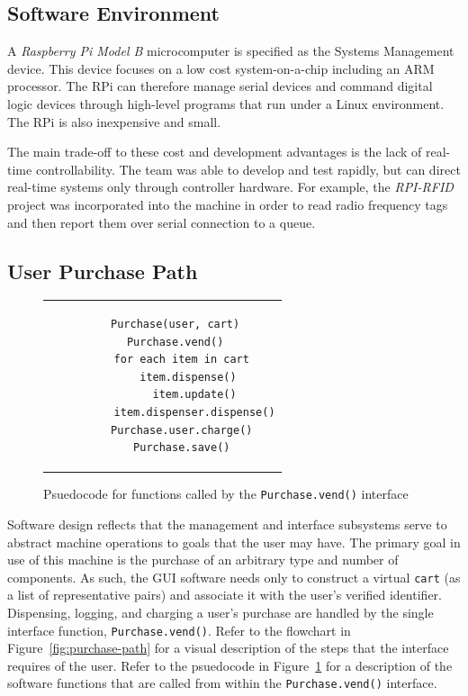 \documentclass[12pt,oneside,final]{article}
\begin{document}
\subsection{Software Environment}
A \emph{Raspberry Pi Model B} microcomputer is specified as the Systems Management device. This device focuses on a low cost system-on-a-chip including an ARM processor. The RPi can therefore manage serial devices and command digital logic devices through high-level programs that run under a Linux environment. The RPi is also inexpensive and small.

The main trade-off to these cost and development advantages is the lack of real-time controllability. The team was able to develop and test rapidly, but can direct real-time systems only through controller hardware. For example, the \emph{RPI-RFID} project was incorporated into the machine in order to read radio frequency tags and then report them over serial connection to a queue.

\subsection{User Purchase Path}

\begin{figure}%
  \centering%
  \begin{tabular}{c}%
  \begin{lstlisting}
    Purchase(user, cart)
    Purchase.vend()
      for each item in cart
        item.dispense()
          item.update()
          item.dispenser.dispense()
      Purchase.user.charge()
      Purchase.save()
  \end{lstlisting}
  \end{tabular}%
  \label{fig:purchase-vend}%
  \caption{\scriptsize Psuedocode for functions called by the \texttt{Purchase.vend()} interface}%
\end{figure}

Software design reflects that the management and interface subsystems serve to abstract machine operations to goals that the user may have. The primary goal in use of this machine is the purchase of an arbitrary type and number of components. As such, the GUI software needs only to construct a virtual \texttt{cart} (as a list of representative pairs) and associate it with the user's verified identifier. Dispensing, logging, and charging a user's purchase are handled by the single interface function, \texttt{Purchase.vend()}. Refer to the flowchart in Figure~\ref{fig:purchase-path} for a visual description of the steps that the interface requires of the user. Refer to the psuedocode in Figure~\ref{fig:purchase-vend} for a description of the software functions that are called from within the \texttt{Purchase.vend()} interface.
\end{document}
